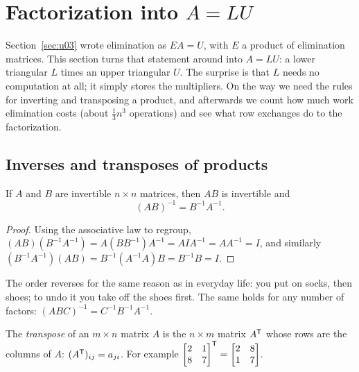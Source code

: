 \section{Factorization into \texorpdfstring{\(A=LU\)}{A = LU}}\label{sec:u05}

Section~\ref{sec:u03} wrote elimination as $EA=U$, with $E$ a product of elimination
matrices. This section turns that statement around into $A=LU$: a lower triangular $L$ times
an upper triangular $U$. The surprise is that $L$ needs no computation at all; it simply
stores the multipliers. On the way we need the rules for inverting and transposing a product,
and afterwards we count how much work elimination costs (about $\tfrac13n^3$ operations)
and see what row exchanges do to the factorization.

\subsection{Inverses and transposes of products}

\begin{theorem}\label{thm:u05-inv-product}
If $A$ and $B$ are invertible $n\times n$ matrices, then $AB$ is invertible and
\[
  (AB)^{-1}=B^{-1}A^{-1}.
\]
\end{theorem}

\begin{proof}
Using the associative law to regroup,
$(AB)(B^{-1}A^{-1})=A(BB^{-1})A^{-1}=AIA^{-1}=AA^{-1}=I$, and similarly
$(B^{-1}A^{-1})(AB)=B^{-1}(A^{-1}A)B=B^{-1}B=I$.
\end{proof}

The order reverses for the same reason as in everyday life: you put on socks, then shoes;
to undo it you take off the shoes first. The same holds for any number of factors:
$(ABC)^{-1}=C^{-1}B^{-1}A^{-1}$.

\begin{definition}[Transpose]\label{def:u05-transpose}
The \emph{transpose} of an $m\times n$ matrix $A$ is the $n\times m$ matrix $A^{\mathsf{T}}$ whose rows
are the columns of $A$: $(A^{\mathsf{T}})_{ij}=a_{ji}$. For example
$\begin{bmatrix} 2 & 1\\ 8 & 7\end{bmatrix}^{\mathsf{T}}=\begin{bmatrix} 2 & 8\\ 1 & 7\end{bmatrix}$.
\end{definition}

